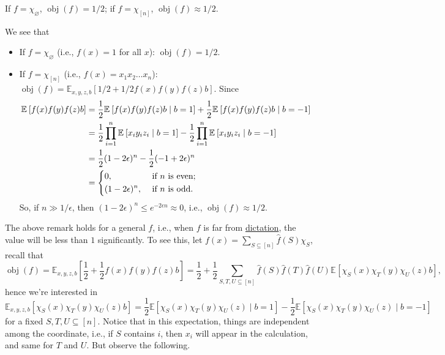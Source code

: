 \begin{remark}
	If \(f = \chi _\varnothing \), \(\mathop{\mathrm{obj}}(f) = 1/2\); if \(f = \chi _{[n]}\), \(\mathop{\mathrm{obj}}(f) \approx 1 / 2\).
\end{remark}
\begin{explanation}
	We see that
	\begin{itemize}
		\item If \(f = \chi _\varnothing \) (i.e., \(f(x) = 1\) for all \(x\)): \(\mathop{\mathrm{obj}}(f) = 1 / 2\).
		\item If \(f = \chi _{[n]}\) (i.e., \(f(x) = x_1 x_2 \ldots  x_n\)): \(\mathop{\mathrm{obj}}(f) = \mathbb{E}_{x, y, z, b}\left[1 / 2 + 1 / 2 f(x)f(y)f(z)b \right] \). Since
		      \[
			      \begin{split}
				      \mathbb{E}_{}\left[f(x) f(y) f(z) b \right]
				      &= \frac{1}{2} \mathbb{E}_{}\left[f(x) f(y) f(z) b \mid b = 1 \right] + \frac{1}{2} \mathbb{E}_{}\left[f(x) f(y) f(z) b \mid b = -1 \right] \\
				      &= \frac{1}{2} \prod_{i=1}^{n} \mathbb{E}_{}\left[x_i y_i z_i \mid b = 1 \right] - \frac{1}{2} \prod_{i=1}^{n} \mathbb{E}_{}\left[x_i y_i z_i \mid b = -1 \right] \\
				      &= \frac{1}{2} (1 - 2 \epsilon )^n - \frac{1}{2} (-1 + 2\epsilon )^n\\
				      &= \begin{dcases}
					      0,                & \text{ if \(n\) is even}  ; \\
					      (1-2\epsilon )^n, & \text{ if \(n\) is odd}.
				      \end{dcases}
			      \end{split}
		      \]
		      So, if \(n \gg 1 / \epsilon \), then \((1 - 2 \epsilon )^n \leq e^{-2 \epsilon n} \approx 0\), i.e., \(\mathop{\mathrm{obj}}(f) \approx 1 / 2\).
	\end{itemize}
\end{explanation}

The above remark holds for a general \(f\), i.e., when \(f\) is far from \hyperref[def:dictation]{dictation}, the value will be less than \(1\) significantly. To see this, let \(f(x) = \sum_{S \subseteq [n]} \hat{f} (S)\chi _S\), recall that
\[
	\mathop{\mathrm{obj}}(f)
	= \mathbb{E}_{x, y, z, b}\left[\frac{1}{2} + \frac{1}{2} f(x) f(y) f(z) b \right]
	= \frac{1}{2} + \frac{1}{2} \sum_{S, T, U \subseteq [n]} \hat{f} (S) \hat{f} (T) \hat{f} (U) \mathbb{E}_{}\left[\chi _S(x) \chi _T(y) \chi _U(z) b \right],
\]
hence we're interested in
\[
	\mathbb{E}_{x, y, z, b}\left[\chi _S(x) \chi _T(y) \chi _U (z) b \right]
	= \frac{1}{2} \mathbb{E}\left[\chi _S(x) \chi _T(y) \chi _U (z) \mid b=1\right] - \frac{1}{2} \mathbb{E}\left[\chi _S(x) \chi _T(y) \chi _U (z) \mid b=-1\right]
\]
for a fixed \(S, T, U \subseteq [n]\). Notice that in this expectation, things are independent among the coordinate, i.e., if \(S\) contains \(i\), then \(x_i\) will appear in the calculation, and same for \(T\) and \(U\). But observe the following.

